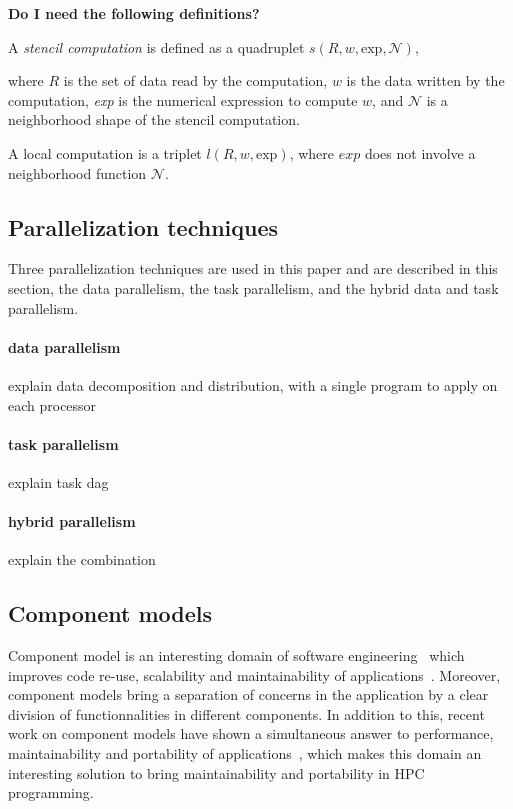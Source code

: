 \textbf{Do I need the following definitions?}
\begin{mydef}
A \textit{stencil computation} is defined as a quadruplet $s(R,w,\text{exp},\mathcal{N})$,
\end{mydef}
where $R$ is the set of data read by the computation, $w$ is the data written by the computation, \textit{exp} is the numerical expression to compute $w$, and $\mathcal{N}$ is a neighborhood shape of the stencil computation.

\begin{mydef}
A local computation is a triplet $l(R,w,\text{exp})$, where $exp$ does not involve a neighborhood function $\mathcal{N}$.
\end{mydef}

\subsection{Parallelization techniques}
\label{sect:parallel}
Three parallelization techniques are used in this paper and are described in this section, the data parallelism, the task parallelism, and the hybrid data and task parallelism.

\paragraph{data parallelism} explain data decomposition and distribution, with a single program to apply on each processor

\paragraph{task parallelism} explain task dag

\paragraph{hybrid parallelism} explain the combination


\subsection{Component models}
Component model is an interesting domain of software engineering~\cite{Szyperski:2002:CSB:515228} which improves code re-use, scalability and maintainability of applications~\cite{Szyperski:2002:CSB:515228,bigot:inria-00388508}. Moreover, component models bring a separation of concerns in the application by a clear division of functionnalities in different components. In addition to this, recent work on component models have shown a simultaneous answer to performance, maintainability and portability of applications~\cite{l2c}, which makes this domain an interesting solution to bring maintainability and portability in HPC programming.

